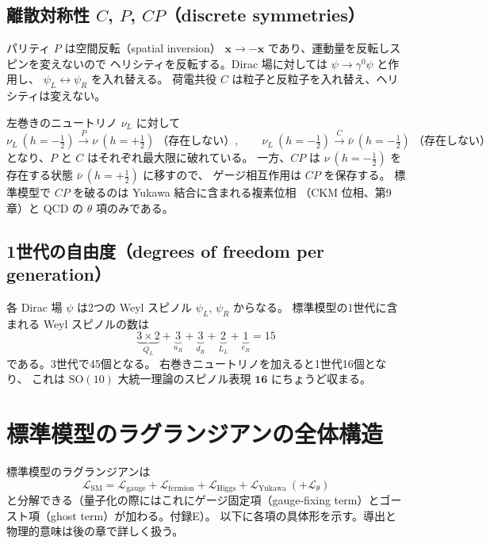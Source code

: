\documentclass[uplatex,dvipdfmx,a4paper,11pt,openany]{jsbook}
\newcommand{\en}[1]{（#1）}
\numberwithin{equation}{chapter}
\theoremstyle{definition}
\theoremstyle{plain}
\theoremstyle{remark}
\newcommand{\Lag}{\mathcal{L}}
\newcommand{\SM}{\mathrm{SM}}
\begin{document}
\subsection{離散対称性 $C$, $P$, $CP$（discrete symmetries）}
パリティ $P$ は空間反転\en{spatial inversion} $\bm x\to-\bm x$ であり、運動量を反転しスピンを変えないので
ヘリシティを反転する。Dirac 場に対しては $\psi\to\gamma^0\psi$ と作用し、
$\psi_L\leftrightarrow\psi_R$ を入れ替える。
荷電共役 $C$ は粒子と反粒子を入れ替え、ヘリシティは変えない。

左巻きのニュートリノ $\nu_L$ に対して
\begin{equation}
\nu_L\ (h=-\tfrac12)
\xrightarrow{\ P\ }
\nu\ (h=+\tfrac12)\ \text{（存在しない）},
\qquad
\nu_L\ (h=-\tfrac12)
\xrightarrow{\ C\ }
\bar\nu\ (h=-\tfrac12)\ \text{（存在しない）}
\end{equation}
となり、$P$ と $C$ はそれぞれ最大限に破れている。
一方、$CP$ は $\nu\ (h=-\frac12)$ を存在する状態 $\bar\nu\ (h=+\frac12)$ に移すので、
ゲージ相互作用は $CP$ を保存する。
標準模型で $CP$ を破るのは Yukawa 結合に含まれる複素位相
（CKM 位相、第9章）と QCD の $\theta$ 項のみである。
\subsection{1世代の自由度（degrees of freedom per generation）}
各 Dirac 場 $\psi$ は2つの Weyl スピノル $\psi_L$, $\psi_R$ からなる。
標準模型の1世代に含まれる Weyl スピノルの数は
\begin{equation}
\underbrace{3\times2}_{Q_L}
+\underbrace{3}_{u_R}
+\underbrace{3}_{d_R}
+\underbrace{2}_{L_L}
+\underbrace{1}_{e_R}
=15
\end{equation}
である。3世代で45個となる。
右巻きニュートリノを加えると1世代16個となり、
これは $\mathrm{SO}(10)$ 大統一理論のスピノル表現 $\mathbf{16}$ にちょうど収まる。
\section{標準模型のラグランジアンの全体構造}
\label{sec:SM-lagrangian}
標準模型のラグランジアンは
\begin{equation}
\boxed{
\Lag_{\SM}
=
\Lag_{\mathrm{gauge}}
+\Lag_{\mathrm{fermion}}
+\Lag_{\mathrm{Higgs}}
+\Lag_{\mathrm{Yukawa}}
\ (+\Lag_\theta)
}
\end{equation}
と分解できる（量子化の際にはこれにゲージ固定項\en{gauge-fixing term}とゴースト項\en{ghost term}が加わる。付録E）。
以下に各項の具体形を示す。導出と物理的意味は後の章で詳しく扱う。
\end{document}
